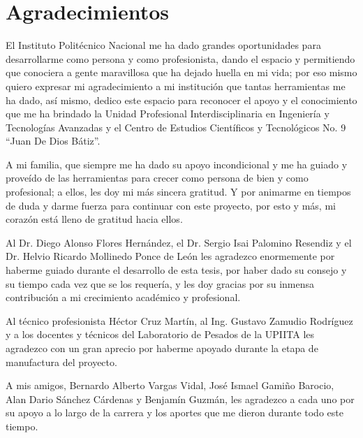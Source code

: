\chapter*{Agradecimientos}
	
	\vspace*{5mm}
	
	El Instituto Politécnico Nacional me ha dado grandes oportunidades para desarrollarme como persona y como profesionista, dando el espacio y permitiendo que conociera a gente maravillosa que ha dejado huella en mi vida; por eso mismo quiero expresar mi agradecimiento a mi institución que tantas herramientas me ha dado, así mismo, dedico este espacio para reconocer el apoyo y el conocimiento que me ha brindado la Unidad Profesional Interdisciplinaria en Ingeniería y Tecnologías Avanzadas y el Centro de Estudios Científicos y Tecnológicos No. 9 ``Juan De Dios Bátiz''.
	
	A mi familia, que siempre me ha dado su apoyo incondicional y me ha guiado y proveído de las herramientas para crecer como persona de bien y como profesional; a ellos, les doy mi más sincera gratitud. Y por animarme en tiempos de duda y darme fuerza para continuar con este proyecto, por esto y más, mi corazón está lleno de gratitud hacia ellos.
	
	Al Dr. Diego Alonso Flores Hernández, el Dr. Sergio Isai Palomino Resendiz y el Dr. Helvio Ricardo Mollinedo Ponce de León les agradezco enormemente por haberme guiado durante el desarrollo de esta tesis, por haber dado su consejo y su tiempo cada vez que se los requería, y les doy gracias por su inmensa contribución a mi crecimiento académico y profesional.
	
	Al técnico profesionista Héctor Cruz Martín, al Ing. Gustavo Zamudio Rodríguez y a los docentes y técnicos del Laboratorio de Pesados de la UPIITA les agradezco con un gran aprecio por haberme apoyado durante la etapa de manufactura del proyecto.
	
	A mis amigos, Bernardo Alberto Vargas Vidal, José Ismael Gamiño Barocio, Alan Dario Sánchez Cárdenas y Benjamín Guzmán, les agradezco a cada uno por su apoyo a lo largo de la carrera y los aportes que me dieron durante todo este tiempo.
